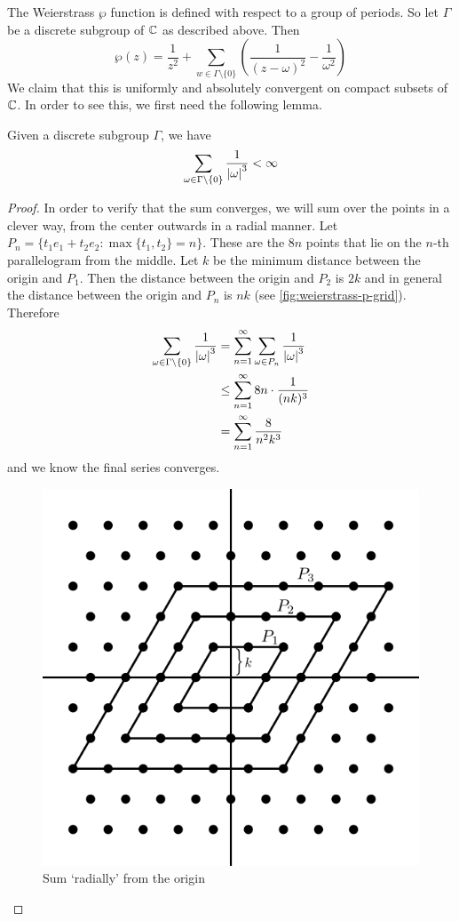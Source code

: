 The Weierstrass $\wp$ function is defined with respect to a group of periods. So let $\Gamma$ be a discrete subgroup of $\mathbb{C}$ as described above. Then
$$\wp(z) = \frac{1}{z^2} + \sum_{w \in \Gamma \setminus \{0\}} \left( \frac{1}{(z - \omega)^2} - \frac{1}{\omega^2} \right)$$
We claim that this is uniformly and absolutely convergent on compact subsets of $\mathbb{C}$. In order to see this, we first need the following lemma.
\begin{lemma}
Given a discrete subgroup $\Gamma$, we have 
$$\sum_{\omega \in \Gamma \setminus \{0\}} \frac{1}{\left|\omega\right|^3} < \infty$$
\end{lemma}
\begin{proof}
    In order to verify that the sum converges, we will sum over the points in a clever way, from the center outwards in a radial manner. Let $P_n = \{t_1 e_1 + t_2 e_2 : \max\{t_1, t_2\} = n\}$. These are the $8n$ points that lie on the $n$-th parallelogram from the middle. Let $k$ be the minimum distance between the origin and $P_1$. Then the distance between the origin and $P_2$ is $2k$ and in general the distance between the origin and $P_n$ is $nk$ (see \autoref{fig:weierstrass-p-grid}). Therefore 
    \begin{align*}
        \sum_{\omega \in \Gamma \setminus \{0\}} \frac{1}{\left|\omega\right|^3} &= \sum_{n = 1}^\infty \sum_{\omega \in P_n} \frac{1}{\left|\omega\right|^3}\\
        &\leq \sum_{n = 1}^\infty 8n \cdot \frac{1}{(nk)^3}\\
        &= \sum_{n = 1}^\infty \frac{8}{n^2 k^3}
    \end{align*}
    and we know the final series converges.
    \begin{figure}[ht]
        \centering
        \includegraphics[scale=0.9]{Images/weierstrass_p_grid.png}
        \caption{Sum `radially' from the origin}
        \label{fig:weierstrass-p-grid}
    \end{figure}
\end{proof}

